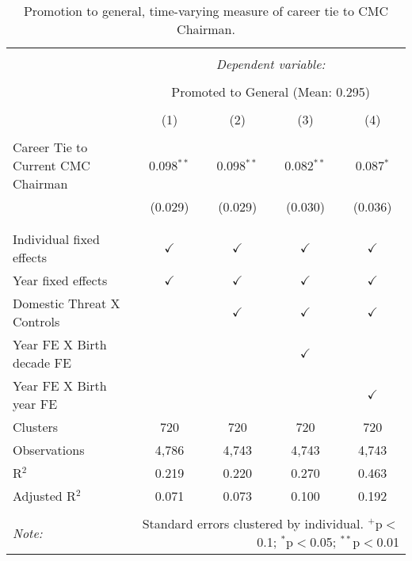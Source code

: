 
\begin{table}[!htbp] \centering 
  \caption{Promotion to general, time-varying measure of career tie to CMC Chairman.} 
  \label{table_a12} 
\begin{tabular}{@{\extracolsep{5pt}}lcccc} 
\\[-1.8ex]\hline 
\hline \\[-1.8ex] 
 & \multicolumn{4}{c}{\textit{Dependent variable:}} \\ 
\cline{2-5} 
\\[-1.8ex] & \multicolumn{4}{c}{Promoted to General (Mean: 0.295)} \\ 
\\[-1.8ex] & (1) & (2) & (3) & (4)\\ 
\hline \\[-1.8ex] 
 Career Tie to Current CMC Chairman & 0.098$^{**}$ & 0.098$^{**}$ & 0.082$^{**}$ & 0.087$^{*}$ \\ 
  & (0.029) & (0.029) & (0.030) & (0.036) \\ 
  & & & & \\ 
\hline \\[-1.8ex] 
Individual fixed effects & $\checkmark$ & $\checkmark$ & $\checkmark$ & $\checkmark$ \\ 
Year fixed effects & $\checkmark$ & $\checkmark$ & $\checkmark$ & $\checkmark$ \\ 
Domestic Threat X Controls &  & $\checkmark$ & $\checkmark$ & $\checkmark$ \\ 
Year FE X Birth decade FE &  &  & $\checkmark$ &  \\ 
Year FE X Birth year FE &  &  &  & $\checkmark$ \\ 
Clusters & 720 & 720 & 720 & 720 \\ 
Observations & 4,786 & 4,743 & 4,743 & 4,743 \\ 
R$^{2}$ & 0.219 & 0.220 & 0.270 & 0.463 \\ 
Adjusted R$^{2}$ & 0.071 & 0.073 & 0.100 & 0.192 \\ 
\hline 
\hline \\[-1.8ex] 
\textit{Note:}  & \multicolumn{4}{r}{Standard errors clustered by individual. $^{+}$p$<$0.1; $^{*}$p$<$0.05; $^{**}$p$<$0.01}} \\ 
\end{tabular} 
\end{table} 
